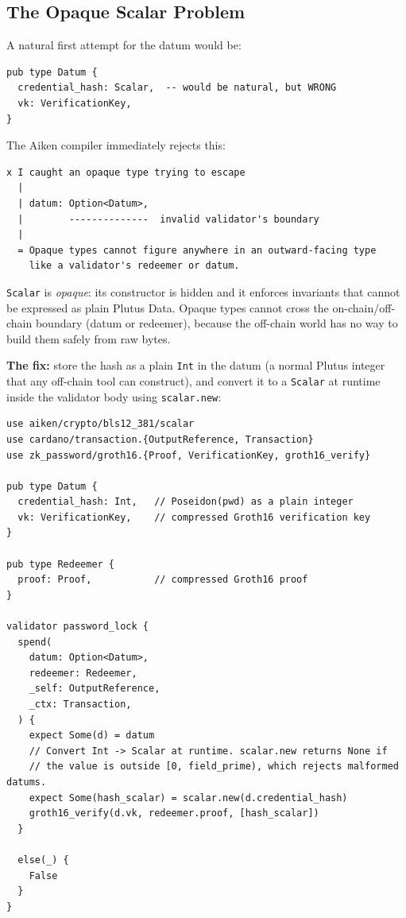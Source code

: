 \subsection*{The Opaque Scalar Problem}

A natural first attempt for the datum would be:

\begin{verbatim}
pub type Datum {
  credential_hash: Scalar,  -- would be natural, but WRONG
  vk: VerificationKey,
}
\end{verbatim}

The Aiken compiler immediately rejects this:

\begin{verbatim}
x I caught an opaque type trying to escape
  |
  | datum: Option<Datum>,
  |        --------------  invalid validator's boundary
  |
  = Opaque types cannot figure anywhere in an outward-facing type
    like a validator's redeemer or datum.
\end{verbatim}

\texttt{Scalar} is \emph{opaque}: its constructor is hidden and it enforces
invariants that cannot be expressed as plain Plutus Data. Opaque types cannot
cross the on-chain/off-chain boundary (datum or redeemer), because the
off-chain world has no way to build them safely from raw bytes.

\textbf{The fix:} store the hash as a plain \texttt{Int} in the datum (a
normal Plutus integer that any off-chain tool can construct), and convert it
to a \texttt{Scalar} at runtime inside the validator body using
\texttt{scalar.new}:

\begin{verbatim}
use aiken/crypto/bls12_381/scalar
use cardano/transaction.{OutputReference, Transaction}
use zk_password/groth16.{Proof, VerificationKey, groth16_verify}

pub type Datum {
  credential_hash: Int,   // Poseidon(pwd) as a plain integer
  vk: VerificationKey,    // compressed Groth16 verification key
}

pub type Redeemer {
  proof: Proof,           // compressed Groth16 proof
}

validator password_lock {
  spend(
    datum: Option<Datum>,
    redeemer: Redeemer,
    _self: OutputReference,
    _ctx: Transaction,
  ) {
    expect Some(d) = datum
    // Convert Int -> Scalar at runtime. scalar.new returns None if
    // the value is outside [0, field_prime), which rejects malformed datums.
    expect Some(hash_scalar) = scalar.new(d.credential_hash)
    groth16_verify(d.vk, redeemer.proof, [hash_scalar])
  }

  else(_) {
    False
  }
}
\end{verbatim}

